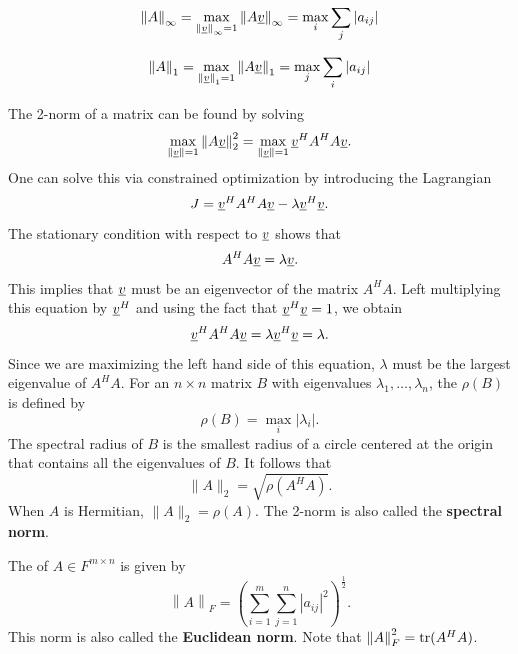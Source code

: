 \begin{equation*}
\left\| A \right\|_{\infty} = \max_{\left\| \underline{v} \right\|_{\infty} = 1} \left\| A \underline{v} \right\|_{\infty} = \max_{i} \sum_{j} |a_{ij}|
\end{equation*}

\begin{equation*}
\left\| A \right\|_{1} = \max_{\left\| \underline{v} \right\|_{1} = 1} \left\| A \underline{v} \right\|_{1} = \max_{j} \sum_{i} |a_{ij}|
\end{equation*}

The 2-norm of a matrix can be found by solving
\begin{equation*}
\max_{\| \underline{v} \|=1} \left\| A \underline{v} \right\|_{2}^{2}
= \max_{\| \underline{v} \|=1} \underline{v}^H A^H A \underline{v} .
\end{equation*}
One can solve this via constrained optimization by introducing the Lagrangian
\begin{equation*}
J = \underline{v}^H A^H A \underline{v} - \lambda \underline{v}^H \underline{v} .
\end{equation*}
The stationary condition with respect to $\underline{v}$ shows that
\begin{equation*}
A^H A \underline{v} = \lambda \underline{v} .
\end{equation*}
This implies that $\underline{v}$ must be an eigenvector of the matrix $A^H A$.
Left multiplying this equation by $\underline{v}^H$ and using the fact that $\underline{v}^H \underline{v} = 1$, we obtain
\begin{equation*}
\underline{v}^H A^H A \underline{v} = \lambda \underline{v}^H \underline{v} = \lambda .
\end{equation*}
Since we are maximizing the left hand side of this equation, $\lambda$ must be the largest eigenvalue of $A^H A$.
For an $n \times n$ matrix $B$ with eigenvalues $\lambda_1, \ldots, \lambda_n$, the  $\rho (B)$ is defined by
\begin{equation*}
\rho (B) = \max_{i} | \lambda_i | .
\end{equation*}
The spectral radius of $B$ is the smallest radius of a circle centered at the origin that contains all the eigenvalues of $B$.
It follows that
\begin{equation*}
\| A \|_2 = \sqrt{ \rho (A^H A) } .
\end{equation*}
When $A$ is Hermitian, $\| A \|_2 = \rho(A)$.
The 2-norm is also called the \textbf{spectral norm}.

The  of $A\in F^{m\times n}$ is given by
\begin{equation*}
\left\| A \right\|_F = \left( \sum_{i=1}^m \sum_{j=1}^n |a_{ij}|^2 \right)^{\frac{1}{2}} .
\end{equation*}
This norm is also called the \textbf{Euclidean norm}.
Note that $\left\| A \right\|_F^2 = \mathrm{tr} (A^H A)$.


